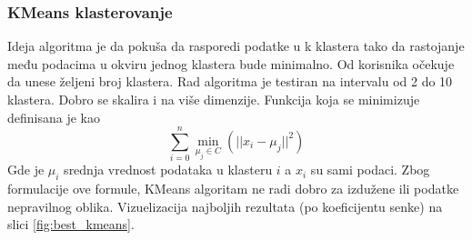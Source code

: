 \documentclass{article}
\begin{document}
\subsubsection{KMeans klasterovanje}

Ideja algoritma je da pokuša da rasporedi podatke u k klastera tako da rastojanje među podacima u okviru jednog klastera bude minimalno. Od korisnika očekuje da unese željeni broj klastera. Rad algoritma je testiran na intervalu od 2 do 10 klastera. Dobro se skalira i na više dimenzije. Funkcija koja se minimizuje definisana je kao $$\sum_{i=0}^{n}\min_{\mu_j \in C}(||x_i - \mu_j||^2)$$
Gde je $\mu_i$ srednja vrednost podataka u klasteru $i$ a $x_i$ su sami podaci. Zbog formulacije ove formule, KMeans algoritam ne radi dobro za izdužene ili podatke nepravilnog oblika. Vizuelizacija najboljih rezultata (po koeficijentu senke) na slici \ref{fig:best_kmeans}.

\begin{table}[H]
\caption{Rezultati klasterovanja algoritmom k-sredina: najbolje se pokazalo klasterovanje datoteke GSM3308814 i to sa k = 4, i uz koriscenje euklidskog rastojanja. Vrednosti ocena najboljih klastera su slicne onima dobijenim i za louvain i leiden klasterovanja. Rezultati su vizuelno predstavljeni na slici \ref{fig:best_kmeans} }
\label{tab:kmeans-results}
\end{table}
\end{document}
